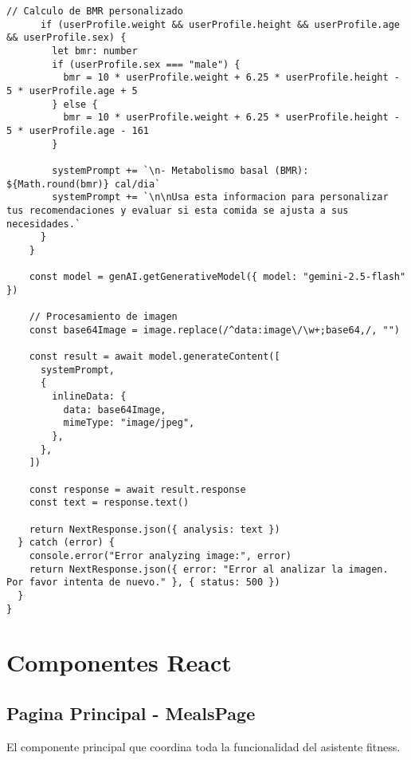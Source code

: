 \documentclass[12pt,a4paper]{article}
\begin{document}
\begin{lstlisting}[caption=API de analisis de imagenes especializada]
      // Calculo de BMR personalizado
      if (userProfile.weight && userProfile.height && userProfile.age && userProfile.sex) {
        let bmr: number
        if (userProfile.sex === "male") {
          bmr = 10 * userProfile.weight + 6.25 * userProfile.height - 5 * userProfile.age + 5
        } else {
          bmr = 10 * userProfile.weight + 6.25 * userProfile.height - 5 * userProfile.age - 161
        }

        systemPrompt += `\n- Metabolismo basal (BMR): ${Math.round(bmr)} cal/dia`
        systemPrompt += `\n\nUsa esta informacion para personalizar tus recomendaciones y evaluar si esta comida se ajusta a sus necesidades.`
      }
    }

    const model = genAI.getGenerativeModel({ model: "gemini-2.5-flash" })

    // Procesamiento de imagen
    const base64Image = image.replace(/^data:image\/\w+;base64,/, "")

    const result = await model.generateContent([
      systemPrompt,
      {
        inlineData: {
          data: base64Image,
          mimeType: "image/jpeg",
        },
      },
    ])

    const response = await result.response
    const text = response.text()

    return NextResponse.json({ analysis: text })
  } catch (error) {
    console.error("Error analyzing image:", error)
    return NextResponse.json({ error: "Error al analizar la imagen. Por favor intenta de nuevo." }, { status: 500 })
  }
}
\end{lstlisting}

\section{Componentes React}

\subsection{Pagina Principal - MealsPage}

El componente principal que coordina toda la funcionalidad del asistente fitness.
\end{document}
